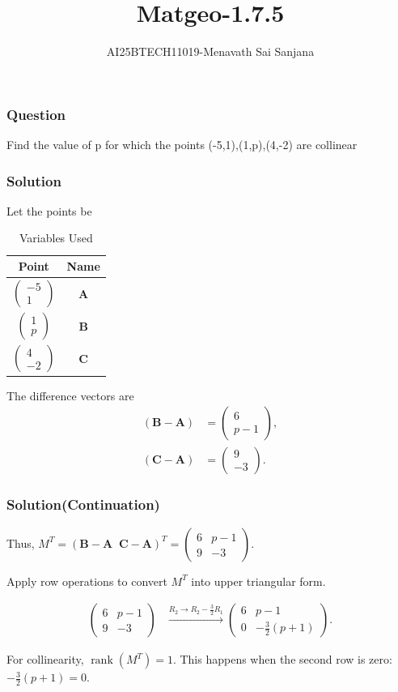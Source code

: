 \documentclass{beamer}
\title{Matgeo-1.7.5}
\author{AI25BTECH11019-Menavath Sai Sanjana}
\date{}
\theoremstyle{remark}
\newcommand{\myvec}[1]{\ensuremath{\begin{pmatrix}#1\end{pmatrix}}}
\let\vec\mathbf
\begin{document}
\begin{frame}
\titlepage
\end{frame}

\begin{frame}
\frametitle{Question}
Find the value of p for which the points (-5,1),(1,p),(4,-2) are collinear
\end{frame}

\begin{frame}
\frametitle{Solution}

Let the points be

\begin{table}[h!]
\centering
\begin{tabular}{|c|c|}
\hline
\textbf{Point} & \textbf{Name} \\
\hline
$\myvec{-5 \\ 1}$ & $\vec{A}$ \\
\hline
$\myvec{1 \\ p}$ & $\vec{B}$ \\
\hline
$\myvec{4 \\ -2}$ & $\vec{C}$ \\
\hline
\end{tabular}
\caption{Variables Used}
\end{table}



The difference vectors are
\begin{align}
(\vec{B}-\vec{A}) &= \myvec{6 \\ p-1}, \\
(\vec{C}-\vec{A}) &= \myvec{9 \\ -3}.
\end{align}

\end{frame}
\begin{frame}
\frametitle{Solution(Continuation)}
Thus,
$
M^T = (\vec{B}-\vec{A} \;\; \vec{C}-\vec{A})^T
= \myvec{6 & p-1 \\ 9 & -3}.
$

Apply row operations to convert $M^T$ into upper triangular form.

\begin{align}
\myvec{6 & p-1 \\ 9 & -3} 
&\xrightarrow{R_2 \to R_2 - \tfrac{3}{2}R_1}
\myvec{6 & p-1 \\ 0 & -\tfrac{3}{2}(p+1)}.
\end{align}

For collinearity, $\operatorname{rank}(M^T)=1$.  
This happens when the second row is zero:
$
-\tfrac{3}{2}(p+1)=0.
$
\end{frame}
\end{document}
